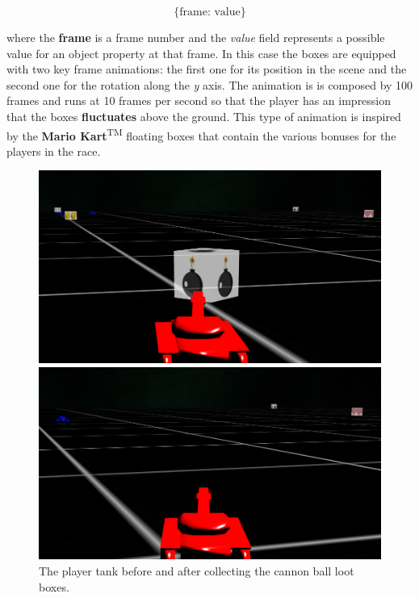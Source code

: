 \documentclass[14pt]{article}
\begin{document}
\[\text{\{frame: value\}}\]

where the \textbf{frame} is a frame number and the \textit{value} field represents a possible value for an object property at that frame. In this case the boxes are equipped with two key frame animations: the first one for its position in the scene and the second one for the rotation along the \textit{y} axis. The animation is is composed by 100 frames and runs at 10 frames per second so that the player has an impression that the boxes \textbf{fluctuates} above the ground. This type of animation is inspired by the \textbf{Mario Kart}\textsuperscript{TM} floating boxes that contain the various bonuses for the players in the race.\\

\begin{figure}[H]
\begin{minipage}[t]{0.45\textwidth}
\center
\includegraphics[width=\textwidth]{images/beforeLoot.png}
\end{minipage}
\hfill
\begin{minipage}[t]{0.45\textwidth}
\center
\includegraphics[width=\textwidth]{images/afterLoot.png}
\end{minipage}
\caption{The player tank before and after collecting the cannon ball loot boxes.}
\label{img:beforeAfterLooting}
\end{figure}
\end{document}
